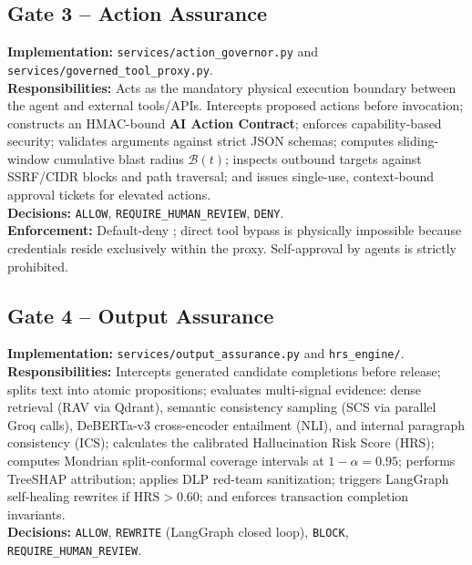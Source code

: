 \documentclass[11pt,a4paper]{article}
\newcommand{\fp}[1]{\texttt{\scriptsize #1}}
\begin{document}
\subsection{Gate 3 -- Action Assurance}
\textbf{Implementation:} \fp{services/action\_governor.py} and \fp{services/governed\_tool\_proxy.py}.\\
\textbf{Responsibilities:} Acts as the mandatory physical execution boundary between the agent and external tools/APIs. Intercepts proposed actions before invocation; constructs an HMAC-bound \textbf{AI Action Contract}; enforces capability-based security; validates arguments against strict JSON schemas; computes sliding-window cumulative blast radius $\mathcal B(t)$; inspects outbound targets against SSRF/CIDR blocks and path traversal; and issues single-use, context-bound approval tickets for elevated actions.\\
\textbf{Decisions:} \texttt{ALLOW}, \texttt{REQUIRE\_HUMAN\_REVIEW}, \texttt{DENY}.\\
\textbf{Enforcement:} Default-deny \cite{saltzer1975}; direct tool bypass is physically impossible because credentials reside exclusively within the proxy. Self-approval by agents is strictly prohibited.

\subsection{Gate 4 -- Output Assurance}
\textbf{Implementation:} \fp{services/output\_assurance.py} and \fp{hrs\_engine/}.\\
\textbf{Responsibilities:} Intercepts generated candidate completions before release; splits text into atomic propositions; evaluates multi-signal evidence: dense retrieval (RAV via Qdrant), semantic consistency sampling (SCS via parallel Groq calls), DeBERTa-v3 cross-encoder entailment (NLI), and internal paragraph consistency (ICS); calculates the calibrated Hallucination Risk Score ($\mathrm{HRS}$); computes Mondrian split-conformal coverage intervals at $1-\alpha=0.95$; performs TreeSHAP attribution; applies DLP red-team sanitization; triggers LangGraph self-healing rewrites if $\mathrm{HRS}>0.60$; and enforces transaction completion invariants.\\
\textbf{Decisions:} \texttt{ALLOW}, \texttt{REWRITE} (LangGraph closed loop), \texttt{BLOCK}, \texttt{REQUIRE\_HUMAN\_REVIEW}.
\end{document}
